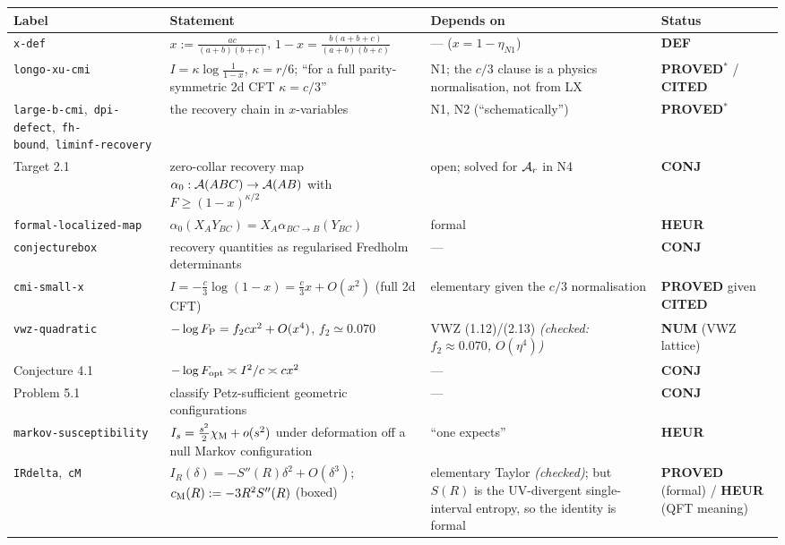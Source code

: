 \documentclass[11pt]{article}
\newcommand{\stPR}{{\color{okgreen}\textsf{\scriptsize\bfseries PROVED}}}
\newcommand{\stPMC}{{\color{teal}\textsf{\scriptsize\bfseries PROVED$^\ast$}}}
\newcommand{\stCIT}{{\color{navy}\textsf{\scriptsize\bfseries CITED}}}
\newcommand{\stNUM}{{\color{orange!80!black}\textsf{\scriptsize\bfseries NUM}}}
\newcommand{\stHEU}{{\color{warn}\textsf{\scriptsize\bfseries HEUR}}}
\newcommand{\stCON}{{\color{warn}\textsf{\scriptsize\bfseries CONJ}}}
\newcommand{\stDEF}{{\textsf{\scriptsize\bfseries DEF}}}
\newcommand{\NI}{N1}\newcommand{\NII}{N2}\newcommand{\NIII}{N3}
\newcommand{\NIV}{N4}\newcommand{\NV}{N5}\newcommand{\NVI}{N6}\newcommand{\NVII}{N7}
\newcommand{\CMI}{I}
\begin{document}
{\footnotesize\setlength{\emergencystretch}{4em}\sloppy{}\relax{}\relax
\begin{tabularx}{\textwidth}{L{0.150\textwidth} X L{0.215\textwidth} L{0.098\textwidth}}
\toprule
\textbf{Label} & \textbf{Statement} & \textbf{Depends on} & \textbf{Status}\\
\midrule\endhead
\texttt{x-def} & $x:=\frac{ac}{(a+b)(b+c)}$, $1-x=\frac{b(a+b+c)}{(a+b)(b+c)}$ & --- ($x=1-\eta_{\NI}$) & \stDEF \\
\texttt{longo-xu-cmi} & $\CMI=\kappa\log\frac1{1-x}$, $\kappa=r/6$; ``for a full parity-symmetric 2d CFT $\kappa=c/3$'' & \NI; the $c/3$ clause is a physics normalisation, not from LX & \stPMC{} / \stCIT \\
\texttt{large-b-cmi},\allowbreak\ \texttt{dpi-defect},\allowbreak\ \texttt{fh-bound},\allowbreak\ \texttt{liminf-\allowbreak recovery} & the recovery chain in $x$-variables & \NI, \NII{} (``schematically'') & \stPMC \\
Target 2.1 & zero-collar recovery map $\alpha_0:\mathcal A(ABC)\to\mathcal A(AB)$ with $F\ge(1-x)^{\kappa/2}$ & open; solved for $\mathcal A_r$ in \NIV & \stCON \\
\texttt{formal-\allowbreak localized-\allowbreak map} & $\alpha_0(X_AY_{BC})=X_A\alpha_{BC\to B}(Y_{BC})$ & formal & \stHEU \\
\texttt{conjecturebox} & recovery quantities as regularised Fredholm determinants & --- & \stCON \\
\texttt{cmi-small-x} & $\CMI=-\frac c3\log(1-x)=\frac c3x+O(x^2)$ (full 2d CFT) & elementary given the $c/3$ normalisation & \stPR{} given \stCIT \\
\texttt{vwz-quadratic} & $-\log F_{\rm P}=f_2cx^2+O(x^4)$, $f_2\simeq0.070$ & VWZ (1.12)/(2.13) \emph{(checked: $f_2\approx0.070$, $O(\eta^4)$)} & \stNUM{} (VWZ lattice) \\
Conjecture 4.1 & $-\log F_{\rm opt}\asymp\CMI^2/c\asymp cx^2$ & --- & \stCON \\
Problem 5.1 & classify Petz-sufficient geometric configurations & --- & \stCON \\
\texttt{markov-\allowbreak susceptibility} & $\CMI_s=\frac{s^2}2\chi_{\rm M}+o(s^2)$ under deformation off a null Markov configuration & ``one expects'' & \stHEU \\
\texttt{IRdelta},\allowbreak\ \texttt{cM} & $\CMI_R(\delta)=-S''(R)\delta^2+O(\delta^3)$; $c_{\rm M}(R):=-3R^2S''(R)$ (boxed) & elementary Taylor \emph{(checked)}; but $S(R)$ is the UV-divergent single-interval entropy, so the identity is formal & \stPR{} (formal) / \stHEU{} (QFT meaning) \\

\end{tabularx}}
\end{document}
